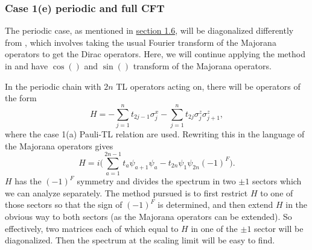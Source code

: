\documentclass[twoside,11pt,titlepage]{amsart}
\renewcommand{\=}[1]{\stackrel{#1}{=}} %
\theoremstyle{definition}
\theoremstyle{remark}
\begin{document}
\subsubsection*{\textbf{Case 1(e) periodic and full CFT}}

\hfill \break

The periodic case, as mentioned in \hyperref[1.6]{section 1.6}, will be diagonalized differently from \cite{koo1994representations}, which involves taking the usual Fourier transform of the Majorana operators to get the Dirac operators. Here, we will continue applying the method in \cite{fendley2014free} and have $\cos()$ and $\sin()$ transform of the Majorana operators.

In the periodic chain with $2n$ TL operators acting on, there will be operators of the form
$$H= -\sum_{j=1}^{n}t_{2j-1}\sigma_j^x-\sum_{j=1}^n t_{2j}\sigma_j^z \sigma_{j+1}^z,$$
where the case 1(a) Pauli-TL relation are used. Rewriting this in the language of the Majorana operators gives
$$H=i \Big(\sum_{a=1}^{2n-1} t_a \psi_{a+1}\psi_a - t_{2n}\psi_1\psi_{2n}(-1)^F \Big).$$
$H$ has the $(-1)^F$ symmetry and divides the spectrum in two $\pm 1$ sectors which we can analyze separately. The method pursued is to first restrict $H$ to one of those sectors so that the sign of $(-1)^F$ is determined, and then extend $H$ in the obvious way to both sectors (as the Majorana operators can be extended). So effectively, two matrices each of which equal to $H$ in one of the $\pm1$ sector will be diagonalized. Then the spectrum at the scaling limit will be easy to find.
\end{document}
